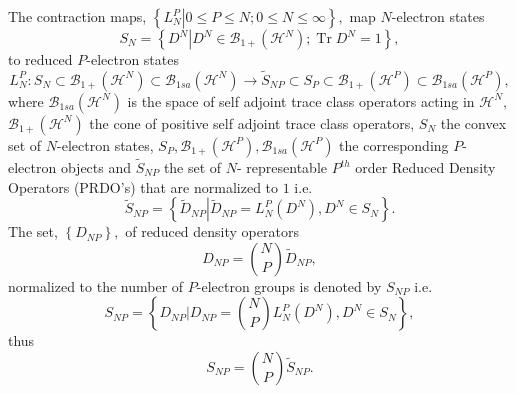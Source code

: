 \documentclass[aps,preprint]{revtex4}%
\begin{document}
The contraction maps, $\left\{  \left.  L_{N}^{P}\right\vert 0\leq P\leq
N;0\leq N\leq\infty\right\}  ,$ map $N$-electron states%
\begin{equation}
S_{N}=\left\{  D^{N}\left\vert D^{N}\in\mathcal{B}_{1+}\left(  \mathcal{H}%
^{N}\right)  ;\operatorname{Tr}D^{N}=1\right.  \right\}  ,
\end{equation}
to reduced $P$-electron states
\begin{equation}
L_{N}^{P}:S_{N}\subset\mathcal{B}_{1+}\left(  \mathcal{H}^{N}\right)
\subset\mathcal{B}_{1sa}\left(  \mathcal{H}^{N}\right)  \longrightarrow
\tilde{S}_{NP}\subset S_{P}\subset\mathcal{B}_{1+}\left(  \mathcal{H}%
^{P}\right)  \subset\mathcal{B}_{1sa}\left(  \mathcal{H}^{P}\right)  ,
\end{equation}
where $\mathcal{B}_{1sa}\left(  \mathcal{H}^{N}\right)  $ is the space of self
adjoint trace class operators acting in $\mathcal{H}^{N},$ $\mathcal{B}%
_{1+}\left(  \mathcal{H}^{N}\right)  $ the cone of positive self adjoint trace
class operators, $S_{N}$ the convex set of $N$-electron states, $S_{P}%
,\mathcal{B}_{1+}\left(  \mathcal{H}^{P}\right)  ,\mathcal{B}_{1sa}\left(
\mathcal{H}^{P}\right)  $ the corresponding $P$-electron objects and
$\tilde{S}_{NP}$ the set of $N$- representable $P^{th}$ order Reduced Density
Operators (PRDO's) that are normalized to $1$ i.e.
\begin{equation}
\tilde{S}_{NP}=\left\{  \left.  \tilde{D}_{NP}\right\vert \tilde{D}_{NP}%
=L_{N}^{P}\left(  D^{N}\right)  ,D^{N}\in S_{N}\right\}  .
\end{equation}
The set, $\left\{  D_{NP}\right\}  ,$ of reduced density operators
\begin{equation}
D_{NP}=\binom{N}{P}\tilde{D}_{NP},
\end{equation}
normalized to the number of $P$-electron groups is denoted by $S_{NP}$ i.e.
\begin{equation}
S_{NP}=\left\{  \left.  D_{NP}\right\vert D_{NP}=\binom{N}{P}L_{N}^{P}\left(
D^{N}\right)  ,D^{N}\in S_{N}\right\}  ,
\end{equation}
thus
\begin{equation}
S_{NP}=\binom{N}{P}\tilde{S}_{NP}.
\end{equation}
\end{document}

